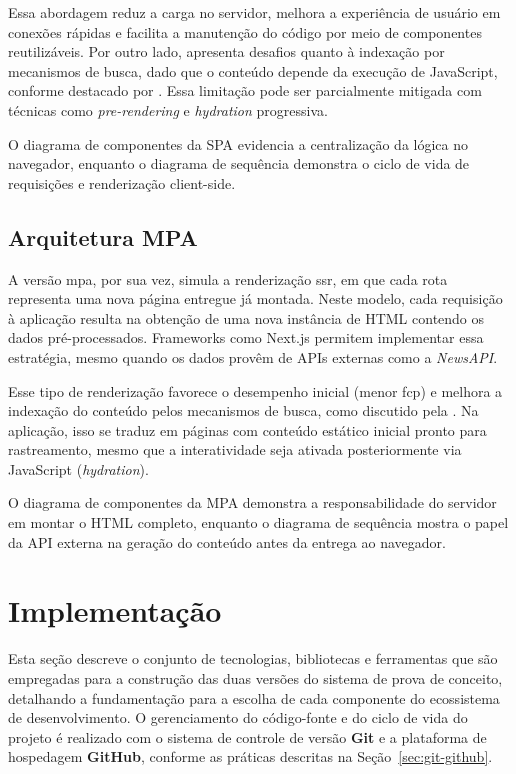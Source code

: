Essa abordagem reduz a carga no servidor, melhora a experiência de usuário em conexões rápidas e facilita a manutenção do código por meio de componentes reutilizáveis. Por outro lado, apresenta desafios quanto à indexação por mecanismos de busca, dado que o conteúdo depende da execução de JavaScript, conforme destacado por \cite{osmani2025}. Essa limitação pode ser parcialmente mitigada com técnicas como \textit{pre-rendering} e \textit{hydration} progressiva.

O diagrama de componentes da SPA evidencia a centralização da lógica no navegador, enquanto o diagrama de sequência demonstra o ciclo de vida de requisições e renderização client-side.

\subsection{Arquitetura MPA}

A versão \acrshort{mpa}, por sua vez, simula a renderização \acrshort{ssr}, em que cada rota representa uma nova página entregue já montada. Neste modelo, cada requisição à aplicação resulta na obtenção de uma nova instância de HTML contendo os dados pré-processados. Frameworks como Next.js permitem implementar essa estratégia, mesmo quando os dados provêm de APIs externas como a \textit{NewsAPI}.

Esse tipo de renderização favorece o desempenho inicial (menor \acrshort{fcp}) e melhora a indexação do conteúdo pelos mecanismos de busca, como discutido pela \cite{atori2024}. Na aplicação, isso se traduz em páginas com conteúdo estático inicial pronto para rastreamento, mesmo que a interatividade seja ativada posteriormente via JavaScript (\textit{hydration}).

O diagrama de componentes da MPA demonstra a responsabilidade do servidor em montar o HTML completo, enquanto o diagrama de sequência mostra o papel da API externa na geração do conteúdo antes da entrega ao navegador.



\section{Implementação}
\label{sec:implementacao}

Esta seção descreve o conjunto de tecnologias, bibliotecas e ferramentas que são empregadas para a construção das duas versões do sistema de prova de conceito, detalhando a fundamentação para a escolha de cada componente do ecossistema de desenvolvimento. O gerenciamento do código-fonte e do ciclo de vida do projeto é realizado com o sistema de controle de versão \textbf{Git} e a plataforma de hospedagem \textbf{GitHub}, conforme as práticas descritas na Seção~\ref{sec:git-github}.

